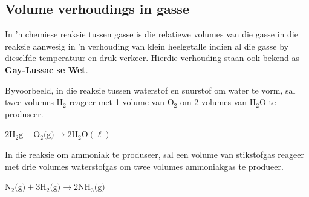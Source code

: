             \subsection*{Volume verhoudings in gasse}
            \nopagebreak
      \label{m38711*id65179}In 'n chemiese reaksie tussen gasse is die relatiewe volumes van die gasse in die reaksie aanwesig in 'n verhouding van klein heelgetalle indien al die gasse by dieselfde temperatuur en druk verkeer. Hierdie verhouding staan ook bekend as \textbf{Gay-Lussac se Wet}.\par 
      \label{m38711*id65189}Byvoorbeeld, in die reaksie tussen waterstof en suurstof om water te vorm, sal twee volumes $\text{H}{}_{2}$ reageer met 1 volume van $\text{O}_{2}$ om 2 volumes van $\text{H}_{2}\text{O}$ te produseer.\par 
      \label{m38711*id65237}$2\text{H}_{2}\text{g} +\text{O}_{2} \text{(g)} \to 2\text{H}_{2}\text{O} (\ell)$\par 
      \label{m38711*id65282}In die reaksie om ammoniak te produseer, sal een volume van stikstofgas reageer met drie volumes waterstofgas om twee volumes ammoniakgas te produeer.\par 
      \label{m38711*id65286}$\text{N}_{2} \text{(g)}+3\text{H}_{2} \text{(g)} \to 2\text{NH}_{3} \text{(g)}$
      \par  
    \label{m38711*cid8}
            \nopagebreak
